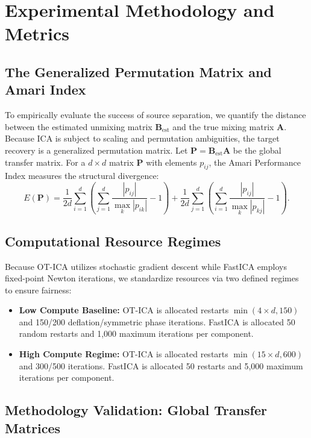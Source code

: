 \documentclass{tpm2026} %
\begin{document}
\section{Experimental Methodology and Metrics}
\label{app:experimental_setup}

\subsection{The Generalized Permutation Matrix and Amari Index}
To empirically evaluate the success of source separation, we quantify the distance between the estimated unmixing matrix $\mathbf{B}_{\text{est}}$ and 
the true mixing matrix $\mathbf{A}$. Because ICA is subject to scaling and permutation ambiguities, the target recovery is a generalized permutation matrix. 
Let $\mathbf{P} = \mathbf{B}_{\text{est}} \mathbf{A}$ be the global transfer matrix. For a $d \times d$ matrix $\mathbf{P}$ with elements $p_{ij}$, 
the Amari Performance Index \citep{amari1996new} measures the structural divergence:
\begin{equation}
    E(\mathbf{P}) = \frac{1}{2d} \sum_{i=1}^d \left( \sum_{j=1}^d \frac{|p_{ij}|}{\max_k |p_{ik}|} - 1 \right) + \frac{1}{2d} \sum_{j=1}^d \left( \sum_{i=1}^d \frac{|p_{ij}|}{\max_k |p_{kj}|} - 1 \right).
\end{equation}

\subsection{Computational Resource Regimes}
Because OT-ICA utilizes stochastic gradient descent while FastICA employs fixed-point Newton iterations, we standardize resources via two defined regimes to ensure fairness:
\begin{itemize}
    \item \textbf{Low Compute Baseline:} OT-ICA is allocated restarts $\min(4 \times d, 150)$ and 150/200 deflation/symmetric phase iterations.
    FastICA is allocated 50 random restarts and 1,000 maximum iterations per component.
    \item \textbf{High Compute Regime:} OT-ICA is allocated restarts $\min(15 \times d, 600)$ and 300/500 iterations.
    FastICA is allocated 50 restarts and 5,000 maximum iterations per component.
\end{itemize}

\subsection{Methodology Validation: Global Transfer Matrices}
\label{app:validation_table}
\end{document}

